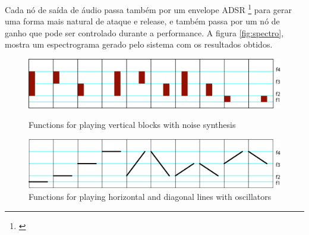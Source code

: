 
Cada nó de saída de áudio passa também por um envelope ADSR \footnote{\cite{Lee2016}} para gerar uma forma mais natural de ataque e release, e também passa por um nó de ganho que pode ser controlado durante a performance. A figura \ref{fig:spectro}, mostra um espectrograma gerado pelo sistema com os resultados obtidos.


\begin{figure}[!ht]
    
        \includegraphics[width=1\textwidth]{pictures/audiotype_v1_noise}
        \vspace{-10pt}
    \caption{Functions for playing vertical blocks with noise synthesis}
    \vspace{10pt}
    \label{fig:noise}
        
        \includegraphics[width=1\textwidth]{pictures/audiotype_v1_sine}
    \caption{Functions for playing horizontal and diagonal lines with oscillators}
    \vspace{-10pt}
    \label{fig:sine}
\vspace{10pt}
\end{figure}

